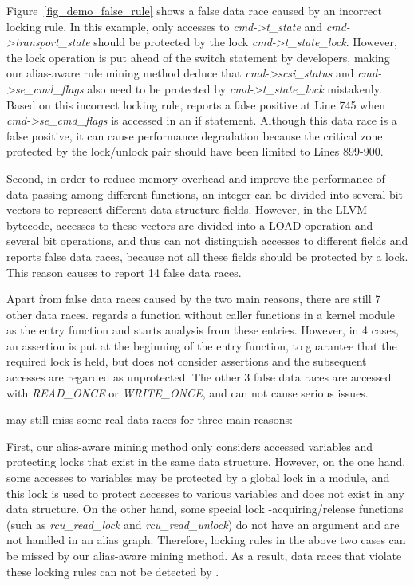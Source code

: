 Figure~\ref{fig_demo_false_rule} shows a false data race caused by an incorrect 
locking rule. In this example, only accesses to {\em cmd->t\_state} and {\em 
cmd->transport\_state} should be protected by the lock {\em 
cmd->t\_state\_lock}. However, the lock operation is put ahead of the switch 
statement by developers, making our alias-aware rule mining method deduce that 
{\em cmd->scsi\_status} and {\em cmd->se\_cmd\_flags} also need to be protected 
by {\em cmd->t\_state\_lock} mistakenly. Based on this incorrect locking rule, 
\sys reports a false positive at Line 745 when {\em cmd->se\_cmd\_flags} is 
accessed in an if statement. Although this data race is a false positive, it 
can cause performance degradation because the critical zone protected by the 
lock/unlock pair should have been limited to Lines 899-900.

Second, in order to reduce memory overhead and improve the performance of data 
passing among different functions, an integer can be divided into several bit 
vectors to represent different data structure fields. However, in the LLVM 
bytecode, accesses to these vectors are divided into a LOAD operation and 
several bit operations, and thus \sys can not distinguish accesses to different 
fields and reports false data races, because not all these fields should be 
protected by a lock. This reason causes \sys to report 14 false data races.

Apart from false data races caused by the two main reasons, there are still 7 
other data races. \sys regards a function without caller functions in a kernel 
module as the entry function and starts analysis from these entries. However, 
in 4 cases, an assertion is put at the beginning of the entry function, to 
guarantee that the required lock is held, but \sys does not consider assertions 
and the subsequent accesses are regarded as unprotected. The other 3 false data 
races are accessed with {\em READ\_ONCE} or {\em WRITE\_ONCE}, and can not 
cause serious issues.

 \sys may still miss some real data races for three main 
reasons:

First, our alias-aware mining method only considers accessed variables and 
protecting locks that exist in the same data structure. However, on the one 
hand, some accesses to variables may be protected by a global lock in a module, 
and this lock is used to protect accesses to various variables and does 
not exist in any data structure. On the other hand, some special lock 
-acquiring/release functions (such as {\em rcu\_read\_lock} and {\em 
rcu\_read\_unlock}) do not have an argument and are not handled in an alias 
graph. Therefore, locking rules in the above two cases can be missed by our 
alias-aware mining method. As a result, data races that violate these locking 
rules can not be detected by \sys.

